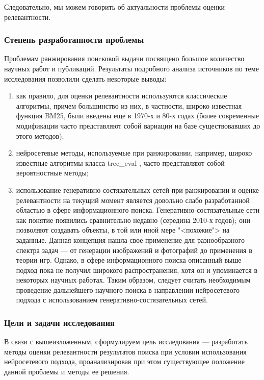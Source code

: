 Следовательно, мы можем говорить об актуальности проблемы оценки релевантности.

\subsubsection{Степень разработанности проблемы}
Проблемам ранжирования поиcковой выдачи посвящено большое количество научных работ и публикаций. Результаты подробного анализа
источников по теме исследования позволили сделать некоторые выводы:
\begin{enumerate}[1)]
      \item как правило, для оценки релевантности используются классические алгоритмы, причем большинство из них, в частности,
            широко известная функция BM25, были введены еще в 1970-х и 80-х годах (более современные модификации часто представляют
            собой вариации на базе существовавших до этого методов);
      \item нейросетевые методы, используемые при ранжировании, например, широко известные алгоритмы класса trec\_eval
            \cite{10.1145/344250.344252}, часто представляют собой вероятностные методы;
      \item использование генеративно-состязательных сетей при ранжировании и оценке релевантности на текущий момент
            является довольно слабо разработанной областью в сфере информационного поиска. Генеративно-состязательные сети как понятие появились
            сравнительно недавно (середина 2010-х годов); они позволяют создавать объекты, в той или иной мере "<похожие"> на заданные.
            Данная концепция нашла свое применение для разнообразного спектра задач --- от генерации изображений и фотографий до
            применения в теории игр. Однако, в сфере информационного поиска описанный выше подход пока не получил широкого распространения,
            хотя он и упоминается в некоторых научных работах. Таким образом, следует считать необходимым проведение
            дальнейшего научного поиска в направлении нейросетевого подхода с использованием генеративно-состязательных сетей.
\end{enumerate}

\subsubsection{Цели и задачи исследования}


В связи с вышеизложенным, сформулируем цель исследования --- разработать методы оценки релевантности результатов поиска при
условии использования нейросетевого подхода, проанализировав при этом существующее положение данной проблемы и методы ее решения.

